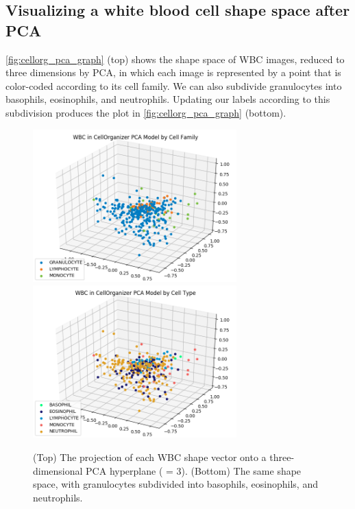 \begin{note}[%
It can be proven that for any dataset, when $d_1$ is smaller than $d_2$, the hyperplane provided by PCA of dimension $d_1$ is \textit{always} a subset of the hyperplane of dimension $d_2$. For example, the first principal component is always found within the plane ($d = 2$) provided by PCA, which was indicated in \autoref{fig:three_dimensional_pca} (left).
]\end{note}

\FloatBarrier
{}
\subsection{Visualizing a white blood cell shape space after PCA}

\autoref{fig:cellorg_pca_graph} (top) shows the shape space of WBC images, reduced to three dimensions by PCA, in which each image is represented by a point that is color-coded according to its cell family. We can also subdivide granulocytes into basophils, eosinophils, and neutrophils. Updating our labels according to this subdivision produces the plot in \autoref{fig:cellorg_pca_graph} (bottom).

\begin{figure}[p]
\centering
\mySfFamily
\includegraphics[width = 0.7\textwidth]{../images/cellorg_pca_graph.png}\\[4ex]
\includegraphics[width = 0.7\textwidth]{../images/cellorg_pca_graph_cell.png}
\caption{(Top) The projection of each WBC shape vector onto a three-dimensional PCA hyperplane ( = 3). (Bottom) The same shape space, with granulocytes subdivided into basophils, eosinophils, and neutrophils.}
\label{fig:cellorg_pca_graph}
\end{figure}



